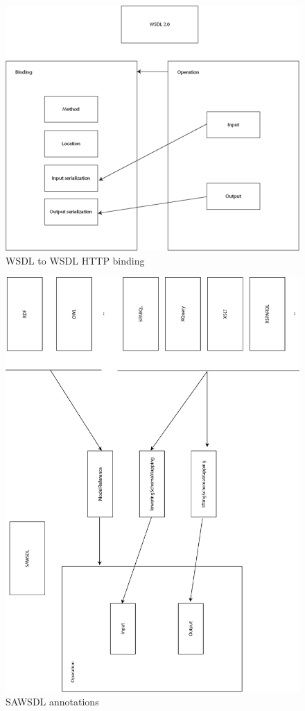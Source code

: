 \begin{figure}[htb!]
\centering%
\includegraphics{wasdl2.png}
\caption{WSDL to WSDL HTTP binding}
\end{figure}

\begin{figure}[htb!]
\centering%
\includegraphics{wasdl3.png}
\caption{SAWSDL annotations}
\end{figure}


